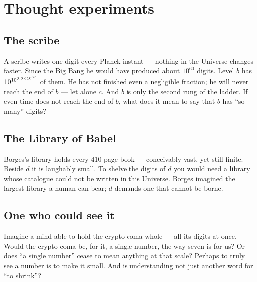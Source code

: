 \section{Thought experiments}

\subsection{The scribe}
A scribe writes one digit every Planck instant --- nothing in the Universe changes faster.
Since the Big Bang he would have produced about \(10^{60}\) digits. Level \(b\) has
\(10^{10^{3.6\times10^{37}}}\) of them. He has not finished even a negligible fraction; he will never reach the
end of \(b\) --- let alone \(c\). And \(b\) is only the second rung of the ladder. If even time does
not reach the end of \(b\), what does it mean to say that \(b\) has ``so many'' digits?

\subsection{The Library of Babel}
Borges's library holds every 410-page book --- conceivably vast, yet still finite. Beside
\(d\) it is laughably small. To shelve the digits of \(d\) you would need a library whose
catalogue could not be written in this Universe. Borges imagined the largest library a human
can bear; \(d\) demands one that cannot be borne.

\subsection{One who could see it}
Imagine a mind able to hold the crypto coma whole --- all its digits at once. Would the
crypto coma be, for it, a single number, the way seven is for us? Or does ``a single
number'' cease to mean anything at that scale? Perhaps to truly see a number is to make it
small. And is understanding not just another word for ``to shrink''?
